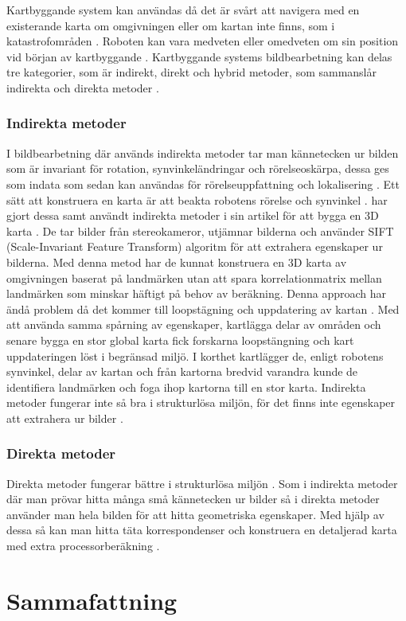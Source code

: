 Kartbyggande system kan användas då det är svårt att navigera med en existerande karta om omgivningen eller om kartan inte finns, som i katastrofområden \citep{geospatial}. Roboten kan vara medveten eller omedveten om sin position vid början av kartbyggande \citep{globalsubmaps}. Kartbyggande systems bildbearbetning kan delas tre kategorier, som är indirekt, direkt och hybrid metoder, som sammanslår indirekta och direkta metoder \citep{geospatial}.

\subsection{Indirekta metoder}

I bildbearbetning där används indirekta metoder tar man kännetecken ur bilden som är invariant för rotation, synvinkeländringar och rörelseoskärpa, dessa ges som indata som sedan kan användas för rörelseuppfattning och lokalisering \citep{geospatial}. Ett sätt att konstruera en karta är att beakta robotens rörelse och synvinkel \citep{globalsubmaps}. \cite{mapbuildingsift} har gjort dessa samt användt indirekta metoder i sin artikel  för att bygga en 3D karta \citep{mapbuildingsift}. De tar bilder från stereokameror, utjämnar bilderna och använder SIFT (Scale-Invariant Feature Transform) algoritm för att extrahera egenskaper ur bilderna. Med denna metod har de kunnat konstruera en 3D karta av omgivningen baserat på landmärken utan att spara korrelationmatrix mellan landmärken som minskar häftigt på behov av beräkning. Denna approach har ändå problem då det kommer till loopstägning och uppdatering av kartan \citep{globalsubmaps}. Med att använda samma spårning av egenskaper, kartlägga delar av områden och senare bygga en stor global karta fick forskarna loopstängning och kart uppdateringen löst i begränsad miljö. I korthet kartlägger de, enligt robotens synvinkel, delar av kartan och från kartorna bredvid varandra kunde de identifiera landmärken och foga ihop kartorna till en stor karta. Indirekta metoder fungerar inte så bra i strukturlösa miljön, för det finns inte egenskaper att extrahera ur bilder \citep{geospatial}.

\subsection{Direkta metoder}

Direkta metoder fungerar bättre i strukturlösa miljön \citep{Engel2014LSDSLAMLD}. Som i indirekta metoder där man prövar hitta många små kännetecken ur bilder så i direkta metoder använder man hela bilden för att hitta geometriska egenskaper. Med hjälp av dessa så kan man hitta täta korrespondenser och konstruera en detaljerad karta med extra processorberäkning \citep{geospatial}. 

\chapter{Sammafattning}

\iffalse
Mäst är inomhus av drönaren
Problem med beräkning, pga batteri kapacitet och komplexa algoritmer och bildbearbetningsalgoritmer
6DoF globalsubmaps
\fi

